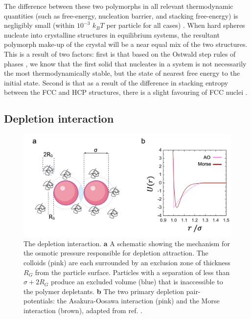 The difference between these two polymorphs in all relevant thermodynamic quantities (such as free-energy, nucleation barrier, and stacking free-energy) is negligibly small (within $10^{-3}$ $k_B T$ per particle for all cases) \cite{woodcock1997,pronk1999}. 
When hard spheres nucleate into crystalline structures in equilibrium systems, the resultant polymorph make-up of the crystal will be a near equal mix of the two structures. This is a result of two factors: first is that based on the Ostwald step rules of phases \cite{ostwald1897}, we know that the first solid that nucleates in a system is not necessarily the most thermodynamically stable, but the state of nearest free energy to the initial state. Second is that as a result of the difference in stacking entropy between the FCC and HCP structures, there is a slight favouring of FCC nuclei \cite{pronk1999,leoni2021,coli2021}.
  


\subsection{Depletion interaction}

\begin{figure}
	\includegraphics[width=\linewidth]{chapters/colloids/figsColloids/figDepAO.png}
	\caption[The depletion interaction]{The depletion interaction. \textbf{a} A schematic showing the mechanism for the osmotic pressure responsible for depletion attraction. The colloids (pink) are each surrounded by an exclusion zone of thickness $R_G$ from the particle surface. Particles with a separation of less than $\sigma + 2R_G$ produce an excluded volume (blue) that is inaccessible to the polymer depletants. \textbf{b} The two primary depletion pair-potentials: the Asakura-Oosawa interaction (pink) and the Morse interaction (brown), adapted from ref. \cite{taffs2010a}.}
	\label{fig:DepAO}
\end{figure}


